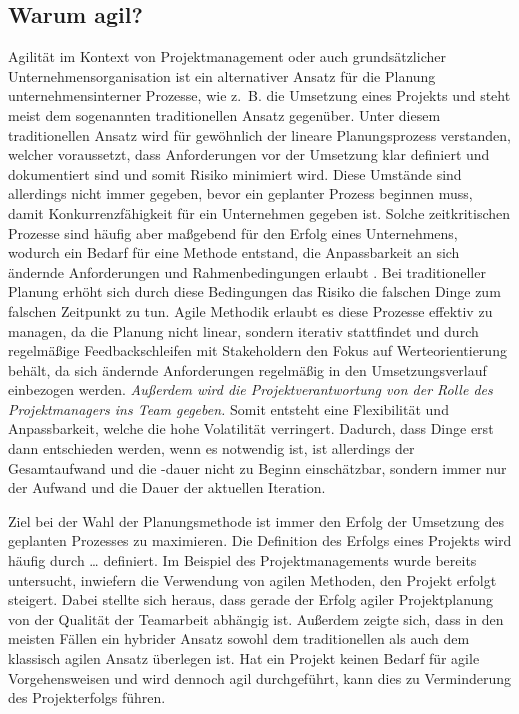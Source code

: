 \subsection{Warum agil?}
Agilität im Kontext von Projektmanagement oder auch grundsätzlicher Unternehmensorganisation ist ein alternativer Ansatz für die Planung unternehmensinterner Prozesse, wie z. B. die Umsetzung eines Projekts und steht meist dem sogenannten traditionellen Ansatz gegenüber. Unter diesem traditionellen Ansatz wird für gewöhnlich der lineare Planungsprozess verstanden, welcher voraussetzt, dass Anforderungen vor der Umsetzung klar definiert und dokumentiert sind und somit Risiko minimiert wird. Diese Umstände sind allerdings nicht immer gegeben, bevor ein geplanter Prozess beginnen muss, damit Konkurrenzfähigkeit für ein Unternehmen gegeben ist. Solche zeitkritischen Prozesse sind häufig aber maßgebend für den Erfolg eines Unternehmens, wodurch ein Bedarf für eine Methode entstand, die Anpassbarkeit an sich ändernde Anforderungen und Rahmenbedingungen erlaubt \cite{}. Bei traditioneller Planung erhöht sich durch diese Bedingungen das Risiko die falschen Dinge zum falschen Zeitpunkt zu tun. Agile Methodik erlaubt es diese Prozesse effektiv zu managen, da die Planung nicht linear, sondern iterativ stattfindet und durch regelmäßige Feedbackschleifen mit Stakeholdern den Fokus auf Werteorientierung behält, da sich ändernde Anforderungen regelmäßig in den Umsetzungsverlauf einbezogen werden. \emph{Außerdem wird die Projektverantwortung von der Rolle des Projektmanagers ins Team gegeben.} Somit entsteht eine Flexibilität und Anpassbarkeit, welche die hohe Volatilität verringert. Dadurch, dass Dinge erst dann entschieden werden, wenn es notwendig ist, ist allerdings der Gesamtaufwand und die -dauer nicht zu Beginn einschätzbar, sondern immer nur der Aufwand und die Dauer der aktuellen Iteration. \cite{agilismVsTranditionalApproaches}

Ziel bei der Wahl der Planungsmethode ist immer den Erfolg der Umsetzung des geplanten Prozesses zu maximieren. Die Definition des Erfolgs eines Projekts wird häufig durch … definiert. Im Beispiel des Projektmanagements wurde bereits untersucht, inwiefern die Verwendung von agilen Methoden, den Projekt erfolgt steigert. Dabei stellte sich heraus, dass gerade der Erfolg agiler Projektplanung von der Qualität der Teamarbeit abhängig ist.
Außerdem zeigte sich, dass in den meisten Fällen ein hybrider Ansatz sowohl dem traditionellen als auch dem klassisch agilen Ansatz überlegen ist. \cite{traditionalAndAgileOnProjectSuccess}
 Hat ein Projekt keinen Bedarf für agile Vorgehensweisen und wird dennoch agil durchgeführt, kann dies zu Verminderung des Projekterfolgs führen. 

